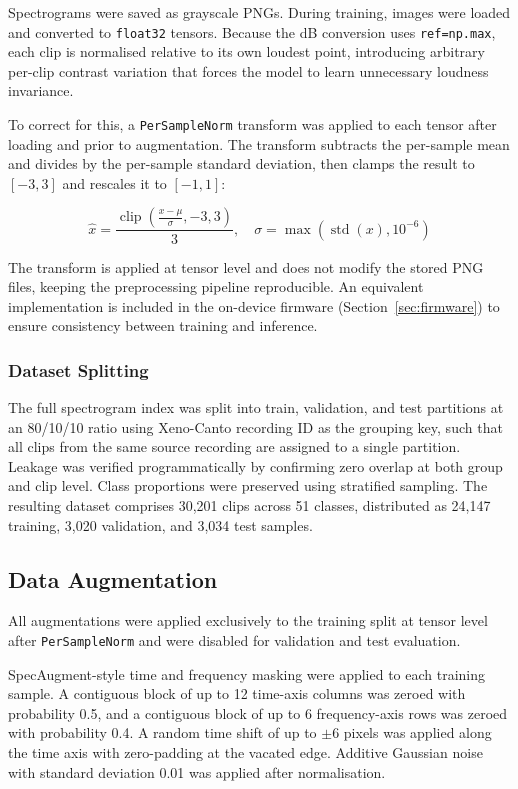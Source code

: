 \documentclass[conference]{IEEEtran}
\begin{document}
Spectrograms were saved as grayscale PNGs. During training, images were loaded and converted to \texttt{float32} tensors. Because the dB conversion uses \texttt{ref=np.max}, each clip is normalised relative to its own loudest point, introducing arbitrary per-clip contrast variation that forces the model to learn unnecessary loudness invariance.

To correct for this, a \texttt{PerSampleNorm} transform was applied to each tensor after loading and prior to augmentation. The transform subtracts the per-sample mean and divides by the per-sample standard deviation, then clamps the result to $[-3,3]$ and rescales it to $[-1,1]$:

\begin{equation}
\hat{x} = \frac{\operatorname{clip}\!\left(\frac{x-\mu}{\sigma}, -3, 3\right)}{3},
\quad
\sigma = \max(\operatorname{std}(x), 10^{-6})
\end{equation}

The transform is applied at tensor level and does not modify the stored PNG files, keeping the preprocessing pipeline reproducible. An equivalent implementation is included in the on-device firmware (Section~\ref{sec:firmware}) to ensure consistency between training and inference.

\subsubsection{Dataset Splitting}
The full spectrogram index was split into train, validation, and test partitions at an 80/10/10 ratio using Xeno-Canto recording ID as the grouping key, such that all clips from the same source recording are assigned to a single partition. Leakage was verified programmatically by confirming zero overlap at both group and clip level. Class proportions were preserved using stratified sampling. The resulting dataset comprises 30,201 clips across 51 classes, distributed as 24,147 training, 3,020 validation, and 3,034 test samples.

\subsection{Data Augmentation}
All augmentations were applied exclusively to the training split at tensor level after \texttt{PerSampleNorm} and were disabled for validation and test evaluation.

SpecAugment-style \cite{park2019specaugment} time and frequency masking were applied to each training sample. A contiguous block of up to 12 time-axis columns was zeroed with probability 0.5, and a contiguous block of up to 6 frequency-axis rows was zeroed with probability 0.4. A random time shift of up to $\pm 6$ pixels was applied along the time axis with zero-padding at the vacated edge. Additive Gaussian noise with standard deviation 0.01 was applied after normalisation.
\end{document}
